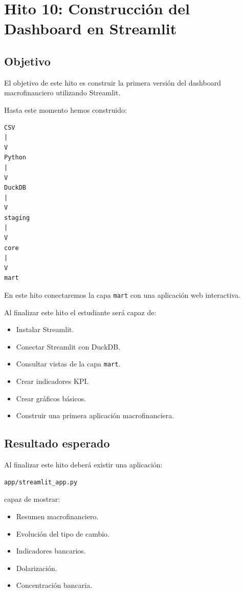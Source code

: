 \chapter{Hito 10: Construcción del Dashboard en Streamlit}

\section{Objetivo}

El objetivo de este hito es construir la primera versión del dashboard macrofinanciero utilizando Streamlit.

Hasta este momento hemos construido:

\begin{verbatim}
CSV
|
V
Python
|
V
DuckDB
|
V
staging
|
V
core
|
V
mart
\end{verbatim}

En este hito conectaremos la capa \texttt{mart} con una aplicación web interactiva.

Al finalizar este hito el estudiante será capaz de:

\begin{itemize}
\item Instalar Streamlit.
\item Conectar Streamlit con DuckDB.
\item Consultar vistas de la capa \texttt{mart}.
\item Crear indicadores KPI.
\item Crear gráficos básicos.
\item Construir una primera aplicación macrofinanciera.
\end{itemize}

\section{Resultado esperado}

Al finalizar este hito deberá existir una aplicación:

\begin{verbatim}
app/streamlit_app.py
\end{verbatim}

capaz de mostrar:

\begin{itemize}
\item Resumen macrofinanciero.
\item Evolución del tipo de cambio.
\item Indicadores bancarios.
\item Dolarización.
\item Concentración bancaria.
\end{itemize}

